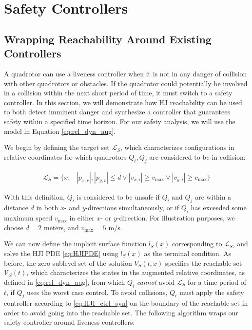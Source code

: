 \section{Safety Controllers \label{sec:safety}}
\subsection{Wrapping Reachability Around Existing Controllers}
A quadrotor can use a liveness controller when it is not in any danger of collision with other quadrotors or obstacles. If the quadrotor could potentially be involved in a collision within the next short period of time, it must switch to a safety controller. In this section, we will demonstrate how HJ reachability can be used to both detect imminent danger and synthesize a controller that guarantees safety within a specified time horizon. For our safety analysis, we will use the model in Equation \eqref{eq:rel_dyn_aug}.

We begin by defining the target set $\mathcal{L}_S$, which characterizes configurations in relative coordinates for which quadrotors $Q_i,Q_j$ are considered to be in collision:

\begin{equation}
\begin{aligned}
\mathcal{L}_S = \{x: &|p_{x,r}|, |p_{y,r}|\le d \vee |v_{x,i}| \ge v_\text{max} \vee |v_{y,i}| \ge v_\text{max} \}
\end{aligned}
\end{equation}

With this definition, $Q_i$ is considered to be unsafe if $Q_i$ and $Q_j$ are within a distance $d$ in both $x$- and $y$-directions simultaneously, or if $Q_i$ has exceeded some maximum speed $v_\text{max}$ in either $x$- or $y$-direction. For illustration purposes, we choose $d=2$ meters, and $v_\text{max}= 5$ m/s.

We can now define the implicit surface function $l_S(x)$ corresponding to $\mathcal{L}_S$, and solve the HJI PDE \eqref{eq:HJIPDE} using $l_S(x)$ as the terminal condition. As before, the zero sublevel set of the solution $V_S(t,x)$ specifies the reachable set $\mathcal{V}_S(t)$, which characterizes the states in the augmented relative coordinates, as defined in \eqref{eq:rel_dyn_aug}, from which $Q_i$ \textit{cannot} avoid $\mathcal{L}_S$ for a time period of $t$, if $Q_j$ uses the worst case control. To avoid collisions, $Q_i$ must apply the safety controller according to \eqref{eq:HJI_ctrl_syn} on the boundary of the reachable set in order to avoid going into the reachable set. The following algorithm wraps our safety controller around liveness controllers:

